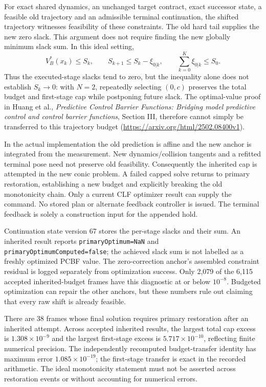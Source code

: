 \documentclass[11pt]{article}
\begin{document}
For exact shared dynamics, an unchanged target contract, exact successor
state, a feasible old trajectory and an admissible terminal continuation,
the shifted trajectory witnesses feasibility of these constraints. The old
hard tail supplies the new zero slack. This argument does not require finding
the new globally minimum slack sum. In this ideal setting,
\[
 V_B^*(x_k)\le S_k,\qquad
 S_{k+1}\le S_k-\xi_{0|k},\qquad
 \sum_{k=0}^K\xi_{0|k}\le S_0.
\]
Thus the executed-stage slacks tend to zero, but the inequality alone does
not establish $S_k\to0$: with $N=2$, repeatedly selecting $(0,c)$ preserves
the total budget and first-stage cap while postponing future slack.
The optimal-value proof in Huang et al., \emph{Predictive Control Barrier
Functions: Bridging model predictive control and control barrier functions},
Section III, therefore cannot simply be transferred to this trajectory budget
(\url{https://arxiv.org/html/2502.08400v1}).

In the actual implementation the old prediction is affine and the new anchor
is integrated from the measurement. New dynamics/collision tangents and a
refitted terminal pose need not preserve old feasibility. Consequently the
inherited cap is attempted in the new conic problem. A failed capped solve
returns to primary restoration, establishing a new budget and explicitly
breaking the old monotonicity chain. Only a current CLF optimizer result can
supply the command. No stored plan or alternate feedback controller is issued.
The terminal feedback is solely a construction input for the appended hold.

Continuation state version 67 stores the per-stage slacks and their sum.
An inherited result reports \texttt{primaryOptimum=NaN} and
\texttt{primaryOptimumComputed=false}; the achieved slack sum is not labelled
as a freshly optimized PCBF value. The zero-correction anchor's assembled
constraint residual is logged separately from optimization success. Only
2,079 of the 6,115 accepted inherited-budget frames have this diagnostic at
or below $10^{-8}$. Budgeted optimization can repair the other anchors, but
these numbers rule out claiming that every raw shift is already feasible.

There are 38 frames whose final solution requires primary restoration after
an inherited attempt. Across accepted inherited results, the largest total
cap excess is $1.308\times10^{-9}$ and the largest first-stage excess is
$5.717\times10^{-10}$, reflecting finite numerical precision. The independently
recomputed budget-transfer identity has maximum error $1.085\times10^{-19}$;
the first-stage transfer is exact in the recorded arithmetic. The ideal
monotonicity statement must not be asserted across restoration events or
without accounting for numerical errors.
\end{document}
